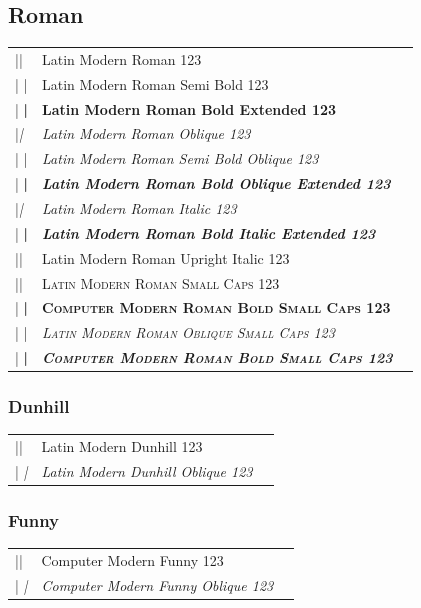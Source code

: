 \documentclass[a4paper]{article}
\makeatletter
\newenvironment{vrb}{\begin{tabular}{@{}p{5.4cm}ll@{}}}{\end{tabular}}
\makeatother
\begin{document}
\subsection*{Roman}

\rmfamily
\begin{vrb}
|\rmfamily| & {Latin Modern Roman 123} \\
|  \sbweight| & {\sbweight Latin Modern Roman Semi Bold 123} \\
|  \bfseries| & {\bfseries Latin Modern Roman Bold Extended 123} \\
|\slshape| & {\slshape Latin Modern Roman Oblique 123} \\
|  \sbweight| & {\sbweight\slshape Latin Modern Roman Semi Bold Oblique 123} \\
|  \bfseries| & {\bfseries\slshape Latin Modern Roman Bold Oblique Extended 123} \\
|\itshape| & {\itshape Latin Modern Roman Italic 123} \\
|  \bfseries| & {\bfseries\itshape Latin Modern Roman Bold Italic Extended 123} \\
|\uishape| & {\uishape Latin Modern Roman Upright Italic 123} \\
|\scshape| & {\scshape Latin Modern Roman Small Caps 123} \\
|  \bfseries| & {\bfseries\scshape Computer Modern Roman Bold Small Caps 123} \\
|  \sishape| & {\scshape\slshape Latin Modern Roman Oblique Small Caps 123} \\
|    \bfseries| & {\slshape\bfseries\scshape Computer Modern Roman Bold Small Caps 123} \\
\end{vrb}

\subsubsection*{Dunhill}

\tistyle
\begin{vrb}
|\tistyle | & {Latin Modern Dunhill 123} \\
|  \slshape| & {\slshape Latin Modern Dunhill Oblique 123} \\
\end{vrb}

\subsubsection*{Funny}

\selectfont
\begin{vrb}
|\fontfamily{cmfr}\selectfont | & {Computer Modern Funny 123} \\
|  \itshape| & {\itshape Computer Modern Funny Oblique 123} \\
\end{vrb}
\end{document}
